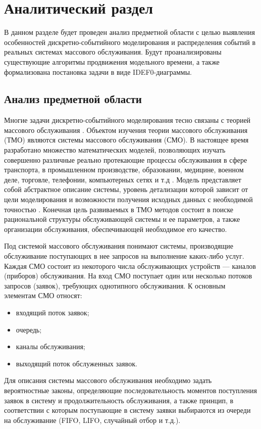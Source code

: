 \chapter{Аналитический раздел}
В данном разделе будет проведен анализ предметной области с целью выявления особенностей дискретно-событийного моделирования и распределения событий в реальных системах массового обслуживания. Будут проанализированы существующие алгоритмы продвижения модельного времени, а также формализована постановка задачи в виде IDEF0-диаграммы.

\section{Анализ предметной области}
Многие задачи дискретно-событийного моделирования тесно связаны с теорией
массового обслуживания \cite{imitation_modelling_def}. Объектом изучения теории массового обслуживания (ТМО) являются системы массового обслуживания (СМО). В настоящее время разработано множество математических моделей, позволяющих изучать совершенно различные реально протекающие процессы обслуживания в сфере транспорта, в промышленном производстве, образовании, медицине, военном деле, торговле, телефонии, компьютерных сетях и т.д \cite{gpss}. Модель представляет собой абстрактное описание системы, уровень детализации которой зависит от цели моделирования и возможности получения исходных данных с необходимой точностью \cite{mass_service_systems}. Конечная цель развиваемых в ТМО методов состоит в поиске рациональной структуры обслуживающей системы и ее параметров, а также организации обслуживания, обеспечивающей необходимое его качество.

Под системой массового обслуживания понимают системы, производящие обслуживание поступающих в нее запросов на выполнение каких-либо услуг. Каждая СМО состоит из некоторого числа обслуживающих устройств --- каналов (приборов) обслуживания.
На вход СМО поступает один или несколько потоков запросов (заявок), требующих однотипного обслуживания. К основным элементам СМО относят:
\begin{itemize}
	\item входящий поток заявок;
	\item очередь;
	\item каналы обслуживания;
	\item выходящий поток обслуженных заявок.	
\end{itemize}

Для описания системы массового обслуживания необходимо задать вероятностные законы, определяющие последовательность моментов поступления заявок в систему и продолжительность обслуживания, а также принцип, в соответствии с которым поступающие в систему заявки выбираются из очереди на обслуживание (FIFO, LIFO, случайный отбор и т.д.).

